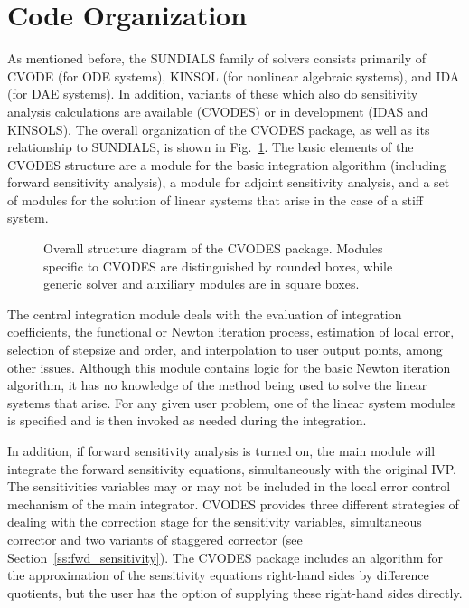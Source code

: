 \section{Code Organization}\label{s:organization}

As mentioned before, the SUNDIALS family of solvers consists primarily of 
CVODE (for ODE systems), KINSOL (for nonlinear algebraic
systems), and IDA (for DAE systems).  
In addition, variants of these which also do sensitivity analysis calculations are
available (CVODES) or in development (IDAS and KINSOLS).
%
The overall organization of the CVODES package, as well as its relationship
to SUNDIALS, is shown in Fig.~\ref{f:cvsorg}.  
The basic elements of the CVODES structure are a module for
the basic integration algorithm (including forward sensitivity analysis),
a module for adjoint sensitivity analysis, and a set of modules for the solution
of linear systems that arise in the case of a stiff system.  
\begin{figure}
\centerline{}
\caption {Overall structure diagram of the CVODES package.
  Modules specific to CVODES are distinguished by rounded boxes, while 
  generic solver and auxiliary modules are in square boxes.}
\label{f:cvsorg}
\end{figure}

The central integration module deals with the evaluation of integration coefficients,
the functional or Newton iteration process, estimation of local error,
selection of stepsize and order, and interpolation to user output
points, among other issues.  Although this module contains logic for
the basic Newton iteration algorithm, it has no knowledge of the
method being used to solve the linear systems that arise.  For any
given user problem, one of the linear system modules is specified and
is then invoked as needed during the integration. 

In addition, if forward sensitivity analysis is turned on, the main module 
will integrate the forward sensitivity equations, simultaneously with the original IVP.
The sensitivities variables may or may not be included in the local error control
mechanism of the main integrator.
CVODES provides three different strategies of dealing with the correction
stage for the sensitivity variables, simultaneous corrector and
two variants of staggered corrector (see Section~\ref{ss:fwd_sensitivity}).
The CVODES package includes an algorithm for the approximation of the sensitivity 
equations right-hand sides by difference quotients, but the user has the option of 
supplying these right-hand sides directly.

